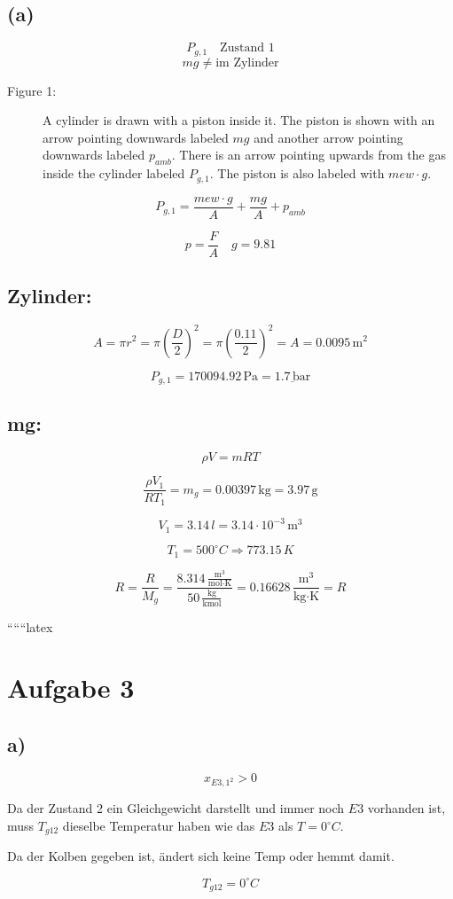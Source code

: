 

\subsection*{(a)}

\[
P_{g,1} \quad \text{Zustand 1}
\]
\[
mg \neq \text{im Zylinder}
\]

\begin{description}
    \item[Figure 1:] A cylinder is drawn with a piston inside it. The piston is shown with an arrow pointing downwards labeled \( mg \) and another arrow pointing downwards labeled \( p_{amb} \). There is an arrow pointing upwards from the gas inside the cylinder labeled \( P_{g,1} \). The piston is also labeled with \( mew \cdot g \).
\end{description}

\[
P_{g,1} = \frac{mew \cdot g}{A} + \frac{mg}{A} + p_{amb}
\]

\[
p = \frac{F}{A} \quad g = 9.81
\]

\subsection*{Zylinder:}

\[
A = \pi r^2 = \pi \left( \frac{D}{2} \right)^2 = \pi \left( \frac{0.11}{2} \right)^2 = A = 0.0095 \, \text{m}^2
\]

\[
P_{g,1} = 170094.92 \, \text{Pa} = \underline{1.7 \, \text{bar}}
\]

\subsection*{mg:}

\[
\rho V = mRT
\]

\[
\frac{\rho V_1}{RT_1} = m_g = 0.00397 \, \text{kg} = 3.97 \, \text{g}
\]

\[
V_1 = 3.14 \, l = 3.14 \cdot 10^{-3} \, \text{m}^3
\]

\[
T_1 = 500^\circ C \Rightarrow 773.15 \, K
\]

\[
R = \frac{R}{M_g} = \frac{8.314 \, \frac{\text{m}^3}{\text{mol} \cdot \text{K}}}{50 \, \frac{\text{kg}}{\text{kmol}}} = 0.16628 \, \frac{\text{m}^3}{\text{kg} \cdot \text{K}} = R
\]

``````latex


\section*{Aufgabe 3}



\subsection*{a)}

\[ x_{E3,1^2} > 0 \]

Da der Zustand 2 ein Gleichgewicht darstellt und immer noch $E3$ vorhanden ist, muss $T_{g12}$ dieselbe Temperatur haben wie das $E3$ als $T = 0^\circ C$.

Da der Kolben gegeben ist, ändert sich keine Temp oder hemmt damit.

\[ T_{g12} = 0^\circ C \]